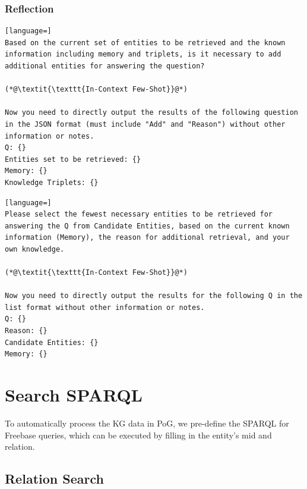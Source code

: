 \documentclass{article}
\begin{document}
\subsubsection{Reflection}
\label{prompt:reflection}
\begin{lstlisting}[language=]
Based on the current set of entities to be retrieved and the known information including memory and triplets, is it necessary to add additional entities for answering the question?

(*@\textit{\texttt{In-Context Few-Shot}}@*)

Now you need to directly output the results of the following question in the JSON format (must include "Add" and "Reason") without other information or notes.
Q: {}
Entities set to be retrieved: {}
Memory: {}
Knowledge Triplets: {}

\end{lstlisting}

\begin{lstlisting}[language=]
Please select the fewest necessary entities to be retrieved for answering the Q from Candidate Entities, based on the current known information (Memory), the reason for additional retrieval, and your own knowledge.

(*@\textit{\texttt{In-Context Few-Shot}}@*)

Now you need to directly output the results for the following Q in the list format without other information or notes.
Q: {}
Reason: {}
Candidate Entities: {}
Memory: {}

\end{lstlisting}
\section{Search SPARQL}
\label{Apx:sparql}
To automatically process the KG data in PoG, we pre-define the SPARQL for Freebase queries, which can be executed by filling in the entity's mid and relation.
\subsection{Relation Search}
\label{Apx:queryrel}
\end{document}
